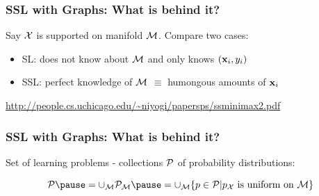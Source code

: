 \documentclass{beamer}
\newcommand{\misoclasstinytitleslide}{Partially based on material by:  Branislav Kveton, \\[-1em] 
Mikhail Belkin, Jerry Zhu}
\begin{document}
\newcommand{\topictitle}{SSL Learnability}
\newcommand{\topicsubtitle}{When Does Graph-Based SSL Provably Help?}
\renewcommand{\misoclasstinytitleslide}{Partially based on material by:  Branislav Kveton, \\[-1em] Mikhail Belkin, Jerry Zhu}

\MakeTopicSlide

\begin{frame}
\frametitle{SSL with Graphs: What is behind it?}

 \pause
\moveb
{} \pause
\moveb
{} \pause
\moveb

Say $\mathcal{X}$ is supported on manifold $\mathcal{M}$. Compare two cases:
\smallskip
\begin{itemize}[<+-| alert@+>]\addtolength{\itemsep}{0.5\baselineskip}
\item SL: does not know about $\mathcal{M}$ and only knows $(\mathbf{x}_i,y_i)$
\item SSL: perfect knowledge of $\mathcal{M}$ \pause $\equiv$ humongous amounts of $\mathbf{x}_i$
\end{itemize}
\bigskip
{\tiny \url{http://people.cs.uchicago.edu/~niyogi/papersps/ssminimax2.pdf}}

\end{frame}
\begin{frame}
\frametitle{SSL with Graphs: What is behind it?}

Set of learning problems - collections $\mathcal{P}$ of probability distributions:

\[
\cP \pause = \cup_\cM \cP_\cM \pause  = \cup_\cM  \{p \in \cP | p_\cX \mbox{ is uniform on } \cM \}
\]

\begin{center}
\end{center}

\end{frame}
\end{document}

